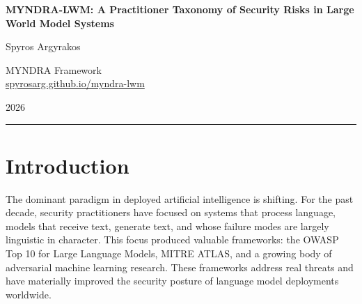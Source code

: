 \documentclass[11pt,a4paper]{article}
\begin{document}
\begin{center}
{\LARGE \textbf{MYNDRA-LWM: A Practitioner Taxonomy of Security Risks in Large World Model Systems}}

\vspace{1.2em}

{\large Spyros Argyrakos}

\vspace{0.4em}

{\normalsize MYNDRA Framework}\\
{\normalsize \href{https://spyrosarg.github.io/myndra-lwm/}{spyrosarg.github.io/myndra-lwm}}

\vspace{0.4em}

{\normalsize 2026}
\end{center}

\vspace{1.5em}
\hrule
\vspace{0.8em}

\begin{abstract}
As autonomous AI systems increasingly rely on internal world models to perceive, reason, and act in physical environments, a critical security gap has emerged: few practitioner frameworks exist for systematically identifying and mitigating attacks targeting the cognitive architecture these systems depend on. Existing frameworks, including OWASP LLM Top 10 and MITRE ATLAS, address language model applications and adversarial machine learning respectively, but do not cover the distinct failure modes of systems that build and act on internal causal representations of reality. I introduce MYNDRA-LWM, an open practitioner taxonomy of security risks in Large World Model systems. Organized around five cognitive architecture components, perception, world state, prediction, planning, and action, the taxonomy defines ten attack categories, each with formal definition, attack vector, detection guidance, and mitigation strategies. MYNDRA-LWM is architecture-agnostic and applies across autonomous vehicles, robotic systems, spacecraft, and AI agents with persistent world state.
\end{abstract}

\vspace{1.5em}

\section{Introduction}

The dominant paradigm in deployed artificial intelligence is shifting. For the past decade, security practitioners have focused on systems that process language, models that receive text, generate text, and whose failure modes are largely linguistic in character. This focus produced valuable frameworks: the OWASP Top 10 for Large Language Models, MITRE ATLAS, and a growing body of adversarial machine learning research. These frameworks address real threats and have materially improved the security posture of language model deployments worldwide.
\end{document}
